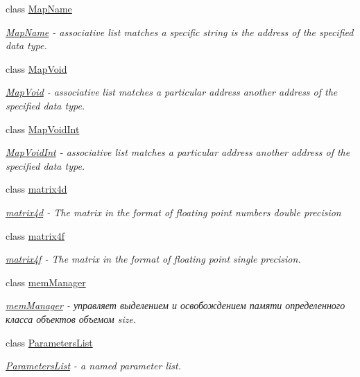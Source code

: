 \begin{DoxyCompactItemize}
class \hyperlink{classbt_1_1_map_name}{Map\-Name}
\begin{DoxyCompactList}\small\item\em \hyperlink{classbt_1_1_map_name}{Map\-Name} -\/ associative list matches a specific string is the address of the specified data type. \end{DoxyCompactList}\item 
class \hyperlink{classbt_1_1_map_void}{Map\-Void}
\begin{DoxyCompactList}\small\item\em \hyperlink{classbt_1_1_map_void}{Map\-Void} -\/ associative list matches a particular address another address of the specified data type. \end{DoxyCompactList}\item 
class \hyperlink{classbt_1_1_map_void_int}{Map\-Void\-Int}
\begin{DoxyCompactList}\small\item\em \hyperlink{classbt_1_1_map_void_int}{Map\-Void\-Int} -\/ associative list matches a particular address another address of the specified data type. \end{DoxyCompactList}\item 
class \hyperlink{classbt_1_1matrix4d}{matrix4d}
\begin{DoxyCompactList}\small\item\em \hyperlink{classbt_1_1matrix4d}{matrix4d} -\/ The matrix in the format of floating point numbers double precision \end{DoxyCompactList}\item 
class \hyperlink{classbt_1_1matrix4f}{matrix4f}
\begin{DoxyCompactList}\small\item\em \hyperlink{classbt_1_1matrix4f}{matrix4f} -\/ The matrix in the format of floating point single precision. \end{DoxyCompactList}\item 
class \hyperlink{classbt_1_1mem_manager}{mem\-Manager}
\begin{DoxyCompactList}\small\item\em \hyperlink{classbt_1_1mem_manager}{mem\-Manager} -\/ управляет выделением и освобождением памяти определенного класса объектов объемом size. \end{DoxyCompactList}\item 
class \hyperlink{classbt_1_1_parameters_list}{Parameters\-List}
\begin{DoxyCompactList}\small\item\em \hyperlink{classbt_1_1_parameters_list}{Parameters\-List} -\/ a named parameter list. \end{DoxyCompactList}\item 

\end{DoxyCompactItemize}
